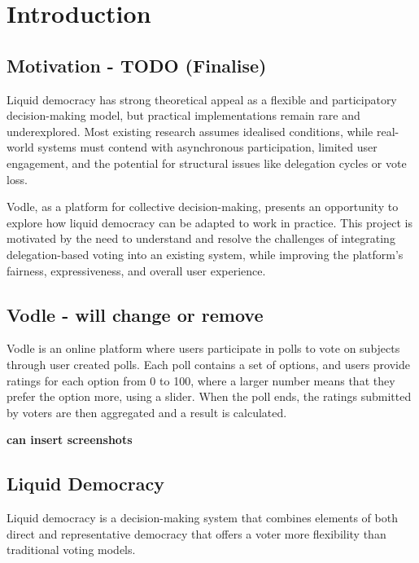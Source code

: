 \chapter{Introduction}
\label{ch:introduction}

\section{Motivation - TODO (Finalise)}
Liquid democracy has strong theoretical appeal as a flexible and participatory decision-making model, but practical implementations remain rare and underexplored. Most existing research assumes idealised conditions, while real-world systems must contend with asynchronous participation, limited user engagement, and the potential for structural issues like delegation cycles or vote loss.

Vodle, as a platform for collective decision-making, presents an opportunity to explore how liquid democracy can be adapted to work in practice. This project is motivated by the need to understand and resolve the challenges of integrating delegation-based voting into an existing system, while improving the platform's fairness, expressiveness, and overall user experience.

\section{Vodle - will change or remove}
Vodle is an online platform where users participate in polls to vote on subjects through user created polls. Each poll contains a set of options, and users provide ratings for each option from 0 to 100, where a larger number means that they prefer the option more, using a slider. When the poll ends, the ratings submitted by voters are then aggregated and a result is calculated.

\textbf{can insert screenshots}

\section{Liquid Democracy}
Liquid democracy is a decision-making system that combines elements of both direct and representative democracy that offers a voter more flexibility than traditional voting models.

